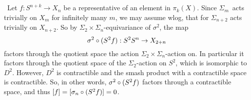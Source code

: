 
\def \L{\mathbb{L}}
\def \O{\mathcal{O}}


\mmaketitle

\begin{exercise}[1]\ 
\end{exercise}

\begin{exercise}[2]\ 
\end{exercise}

\begin{exercise}[3]\ 
Let $f:S^{n+k} \to X_n$ be a representative of an element in $\pi_k(X)$.
Since $\Sigma_m$ acts trivially on $X_m$ for infinitely many $m$, we may assume
wlog, that for $\Sigma_{n+2}$ acts trivially on $X_{n+2}$. 
So by $\Sigma_2 \times \Sigma_n$-equivariance of $\sigma^2$, the map
\[ \sigma^2 \circ (S^2 \smash f) : S^2 \smash S^n \to X_{2+n} \]
factors through the quotient space the action $\Sigma_2 \times
\Sigma_n$-action on. In particular it factors through the quotient space of the
$\Sigma_2$-action on $S^2$, which is isomorphic to $D^2$. However, $D^2$ is
contractible and the smash product with a contractible space is contractible.
So, in other words,
$\sigma^2 \circ (S^2 \smash f)$ factors through a contractible space, and thus 
$[f] = [\sigma_n \circ (S^2 \smash f)] = 0$.
\end{exercise}


